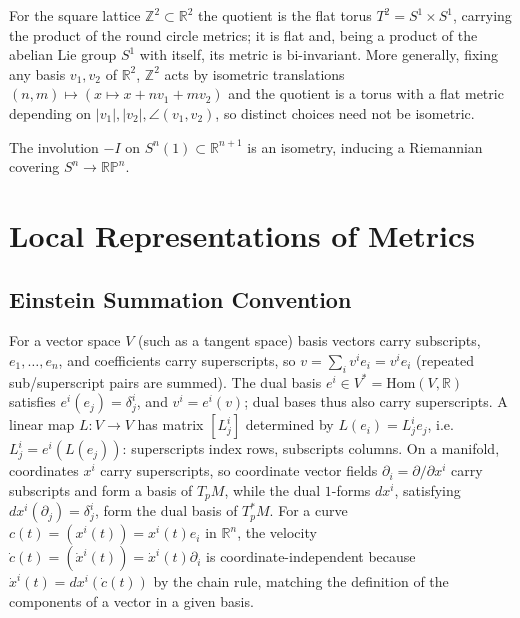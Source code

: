 \begin{example}
  \label{ex:pet-ch1-flat-torus}
  \leanok
  For the square lattice $\mathbb{Z}^2\subset\mathbb{R}^2$ the quotient is the flat torus
  $T^2=S^1\times S^1$, carrying the product of the round circle metrics; it is flat
  and, being a product of the abelian Lie group $S^1$ with itself, its metric is
  bi-invariant. More generally, fixing any basis $v_1,v_2$ of $\mathbb{R}^2$,
  $\mathbb{Z}^2$ acts by isometric translations $(n,m)\mapsto(x\mapsto x+nv_1+mv_2)$
  and the quotient is a torus with a flat metric depending on
  $|v_1|,|v_2|,\angle(v_1,v_2)$, so distinct choices need not be isometric.
\end{example}

\begin{example}
  \label{ex:pet-ch1-real-projective-space}
  \leanok
  The involution $-I$ on $S^n(1)\subset\mathbb{R}^{n+1}$ is an isometry, inducing a
  Riemannian covering $S^n\to\mathbb{RP}^n$.
\end{example}

\section{Local Representations of Metrics}

\subsection{Einstein Summation Convention}

\begin{convention}
  \label{conv:pet-ch1-einstein-summation}
  \leanok
  For a vector space $V$ (such as a tangent space) basis vectors carry
  subscripts, $e_1,\dots,e_n$, and coefficients carry superscripts, so
  $v=\sum_iv^ie_i=v^ie_i$ (repeated sub/superscript pairs are summed). The dual
  basis $e^i\in V^*=\mathrm{Hom}(V,\mathbb{R})$ satisfies $e^i(e_j)=\delta^i_j$, and
  $v^i=e^i(v)$; dual bases thus also carry superscripts. A linear map
  $L:V\to V$ has matrix $[L^i_j]$ determined by $L(e_i)=L^i_je_j$, i.e.
  $L^i_j=e^i(L(e_j))$: superscripts index rows, subscripts columns. On a
  manifold, coordinates $x^i$ carry superscripts, so coordinate vector fields
  $\partial_i=\partial/\partial x^i$ carry subscripts and form a basis of $T_pM$,
  while the dual $1$-forms $dx^i$, satisfying $dx^i(\partial_j)=\delta^i_j$, form
  the dual basis of $T_p^*M$. For a curve $c(t)=(x^i(t))=x^i(t)e_i$ in
  $\mathbb{R}^n$, the velocity $\dot c(t)=(\dot x^i(t))=\dot x^i(t)\partial_i$ is
  coordinate-independent because $\dot x^i(t)=dx^i(\dot c(t))$ by the chain rule,
  matching the definition of the components of a vector in a given basis.
\end{convention}

